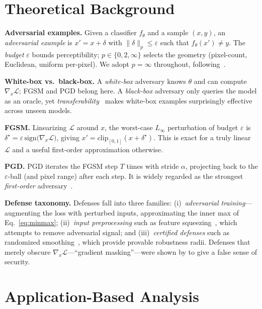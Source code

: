 \documentclass[10pt, twocolumn]{article}
\begin{document}
\section{Theoretical Background}
\label{sec:theory}

\textbf{Adversarial examples.} Given a classifier $f_\theta$ and a sample $(x,y)$, an \emph{adversarial example} is $x' = x + \delta$ with $\|\delta\|_p \le \varepsilon$ such that $f_\theta(x')\neq y$. The \emph{budget} $\varepsilon$ bounds perceptibility; $p\!\in\!\{0,2,\infty\}$ selects the geometry (pixel-count, Euclidean, uniform per-pixel). We adopt $p\!=\!\infty$ throughout, following~\citet{goodfellow2015explaining}.

\textbf{White-box vs.\ black-box.} A \emph{white-box} adversary knows $\theta$ and can compute $\nabla_x\mathcal{L}$; FGSM and PGD belong here. A \emph{black-box} adversary only queries the model as an oracle, yet \emph{transferability}~\citep{papernot2016practical} makes white-box examples surprisingly effective across unseen models.

\textbf{FGSM.} Linearizing $\mathcal{L}$ around $x$, the worst-case $L_\infty$ perturbation of budget $\varepsilon$ is
$\delta^\star = \varepsilon\,\mathrm{sign}\!\bigl(\nabla_x\mathcal{L}\bigr)$, giving $x' = \mathrm{clip}_{[0,1]}(x+\delta^\star)$. This is exact for a truly linear $\mathcal{L}$ and a useful first-order approximation otherwise.

\textbf{PGD.} PGD iterates the FGSM step $T$ times with stride $\alpha$, projecting back to the $\varepsilon$-ball (and pixel range) after each step. It is widely regarded as the strongest \emph{first-order} adversary~\citep{madry2018towards}.

\textbf{Defense taxonomy.} Defenses fall into three families: (i)~\emph{adversarial training}---augmenting the loss with perturbed inputs, approximating the inner max of Eq.~\eqref{eq:minmax}; (ii)~\emph{input preprocessing} such as feature squeezing~\citep{xu2018feature}, which attempts to remove adversarial signal; and (iii)~\emph{certified defenses} such as randomized smoothing~\citep{cohen2019certified}, which provide provable robustness radii. Defenses that merely obscure $\nabla_x\mathcal{L}$---``gradient masking''---were shown by \citet{athalye2018obfuscated} to give a false sense of security.

\section{Application-Based Analysis}
\label{sec:apps}
\end{document}
